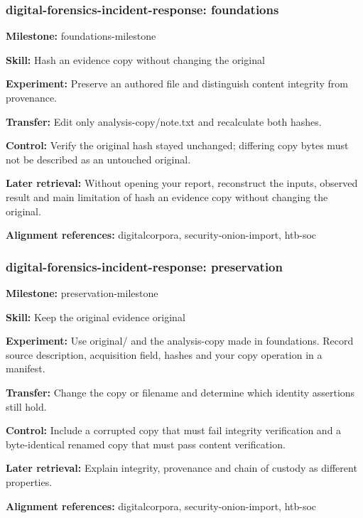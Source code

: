 \subsubsection{digital-forensics-incident-response: foundations}
\noindent\textbf{Milestone:} foundations-milestone\par
\noindent\textbf{Skill:} Hash an evidence copy without changing the original\par
\noindent\textbf{Experiment:} Preserve an authored file and distinguish content integrity from provenance.\par
\noindent\textbf{Transfer:} Edit only analysis-copy/note.txt and recalculate both hashes.\par
\noindent\textbf{Control:} Verify the original hash stayed unchanged; differing copy bytes must not be described as an untouched original.\par
\noindent\textbf{Later retrieval:} Without opening your report, reconstruct the inputs, observed result and main limitation of hash an evidence copy without changing the original.\par
\noindent\textbf{Alignment references:} digitalcorpora, security-onion-import, htb-soc\par
\subsubsection{digital-forensics-incident-response: preservation}
\noindent\textbf{Milestone:} preservation-milestone\par
\noindent\textbf{Skill:} Keep the original evidence original\par
\noindent\textbf{Experiment:} Use original/ and the analysis-copy made in foundations. Record source description, acquisition field, hashes and your copy operation in a manifest.\par
\noindent\textbf{Transfer:} Change the copy or filename and determine which identity assertions still hold.\par
\noindent\textbf{Control:} Include a corrupted copy that must fail integrity verification and a byte-identical renamed copy that must pass content verification.\par
\noindent\textbf{Later retrieval:} Explain integrity, provenance and chain of custody as different properties.\par
\noindent\textbf{Alignment references:} digitalcorpora, security-onion-import, htb-soc\par
